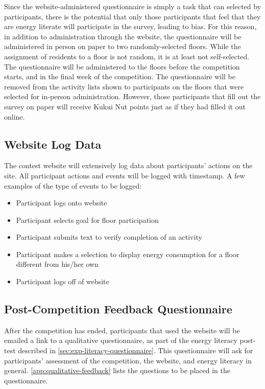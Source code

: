 Since the website-administered questionnaire is simply a task that can selected by participants, there is the potential that only those participants that feel that they are energy literate will participate in the survey, leading to bias. For this reason, in addition to administration through the website, the questionnaire will be administered in person on paper to two randomly-selected floors. While the assignment of residents to a floor is not random, it is at least not self-selected. The questionnaire will be administered to the floors before the competition starts, and in the final week of the competition. The questionnaire will be removed from the activity lists shown to participants on the floors that were selected for in-person administration. However, those participants that fill out the survey on paper will receive Kukui Nut points just as if they had filled it out online.

\subsection{Website Log Data}

The contest website will extensively log data about participants' actions on the site. All participant actions and events will be logged with timestamp. A few examples of the type of events to be logged:

\begin{itemize}
\item Participant logs onto website
\item Participant selects goal for floor participation
\item Participant submits text to verify completion of an activity
\item Participant makes a selection to display energy consumption for a floor different from his/her own
\item Participant logs off of website
\end{itemize}

\subsection{Post-Competition Feedback Questionnaire}
\label{sec:post-competition-feedback}
After the competition has ended, participants that used the website will be emailed a link to a qualitative questionnaire, as part of the energy literacy post-test described in \ref{sec:exp-literacy-questionnaire}. This questionnaire will ask for participants' assessment of the competition, the website, and energy literacy in general. \autoref{app:qualitative-feedback} lists the questions to be placed in the questionnaire.

